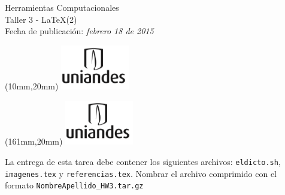 \documentclass[11pt,letterpaper]{exam}
\begin{document}
\begin{center}
{\Large Herramientas Computacionales} \\
Taller 3 - \LaTeX (2)\\
Fecha de publicación: {\small \it febrero 18 de 2015}\\
\end{center}

\begin{textblock*}{40mm}(10mm,20mm)
  \includegraphics[width=3cm]{logoUniandes.png}
\end{textblock*}

\begin{textblock*}{40mm}(161mm,20mm)
  \includegraphics[width=3cm]{logoUniandes.png}
\end{textblock*}

\vspace{0.5cm}

La entrega de esta tarea debe contener los siguientes archivos: \verb'eldicto.sh', \verb'imagenes.tex' y \verb'referencias.tex'. Nombrar el archivo comprimido con el formato \verb'NombreApellido_HW3.tar.gz'\\
\end{document}
